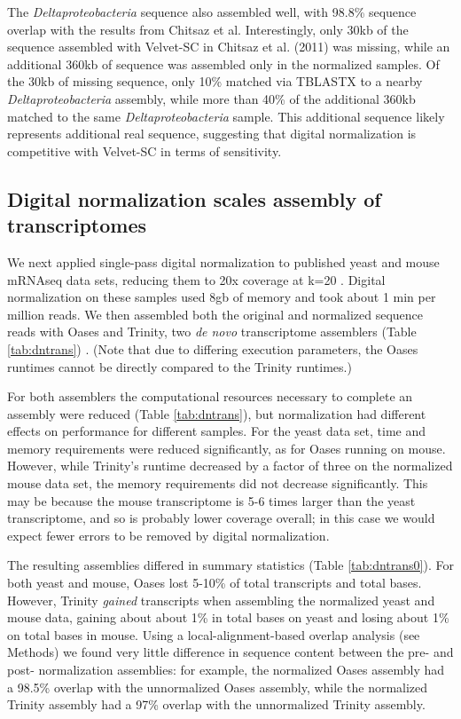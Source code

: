 \documentclass{pnastwo}
\begin{document}
\begin{article}
The {\em Deltaproteobacteria} sequence also assembled well, with
98.8\% sequence overlap with the results from Chitsaz et al.
Interestingly, only 30kb of the sequence assembled with Velvet-SC in
Chitsaz et al. (2011) was missing, while an additional 360kb of
sequence was assembled only in the normalized samples.  Of the 30kb of
missing sequence, only 10\% matched via TBLASTX to a nearby {\em
  Deltaproteobacteria} assembly, while more than 40\% of the
additional 360kb matched to the same {\em Deltaproteobacteria} sample.
This additional sequence likely represents additional real
sequence, suggesting that digital normalization is competitive with
Velvet-SC in terms of sensitivity.


\subsection{Digital normalization scales assembly of transcriptomes}

We next applied single-pass digital normalization to published yeast
and mouse mRNAseq data sets, reducing them to 20x coverage at k=20
\cite{pubmed21572440}.  Digital normalization on these samples used
8gb of memory and took about 1 min per million reads.  We then
assembled both the original and normalized sequence reads with Oases
and Trinity, two {\em de novo} transcriptome assemblers (Table
\ref{tab:dntrans}) \cite{pubmed22368243,pubmed21572440}.  (Note that
due to differing execution parameters, the Oases runtimes cannot be
directly compared to the Trinity runtimes.)

For both assemblers the computational resources necessary to complete
an assembly were reduced (Table \ref{tab:dntrans}), but normalization
had different effects on performance for different samples.  For the
yeast data set, time and memory requirements were reduced
significantly, as for Oases running on mouse.  However, while
Trinity's runtime decreased by a factor of three on the normalized
mouse data set, the memory requirements did not decrease
significantly.  This may be because the mouse transcriptome is 5-6
times larger than the yeast transcriptome, and so is probably lower
coverage overall; in this case we would expect fewer errors to be removed
by digital normalization.

The resulting assemblies differed in summary statistics (Table
\ref{tab:dntrans0}).  For both yeast and mouse, Oases lost 5-10\% of
total transcripts and total bases.  However, Trinity {\em gained}
transcripts when assembling the normalized yeast and mouse data,
gaining about about 1\% in total bases on yeast and losing about 1\%
on total bases in mouse.  Using a local-alignment-based overlap
analysis (see Methods) we found very little difference in sequence
content between the pre- and post- normalization assemblies: for
example, the normalized Oases assembly had a 98.5\% overlap with the
unnormalized Oases assembly, while the normalized Trinity assembly had
a 97\% overlap with the unnormalized Trinity assembly.


\end{article}
\end{document}
